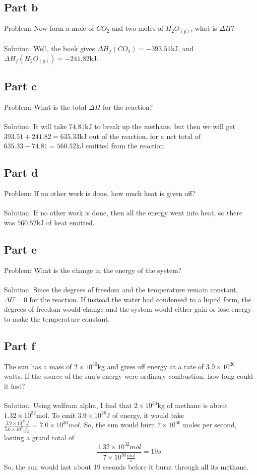 \documentclass[paper=a4, fontsize=11pt]{scrartcl} %
\numberwithin{equation}{section} %
\numberwithin{figure}{section} %
\numberwithin{table}{section} %
\begin{document}
\subsection*{Part b}
Problem: Now form a mole of $CO_2$ and two moles of $H_2O_{(g)}$, what is $\Delta H$?
\\
\\
Solution:
Well, the book gives $\Delta H_f(CO_2) = -393.51$kJ, and $\Delta H_f(H_2O_{(g)}) = -241.82$kJ.

\subsection*{Part c}
Problem: What is the total $\Delta H$ for the reaction?
\\
\\
Solution:
It will take $74.81$kJ to break up the methane, but then we will get $393.51+241.82=635.33$kJ
out of the reaction, for a net total of $635.33-74.81=560.52$kJ emitted from the reaction.

\subsection*{Part d}
Problem: If no other work is done, how much heat is given off?
\\
\\
Solution: If no other work is done, then all the energy went into heat, so there was
$560.52$kJ of heat emitted.

\subsection*{Part e}
Problem: What is the change in the energy of the system?
\\
\\
Solution: Since the degrees of freedom and the temperature remain constant, $\Delta U=0$ for
the reaction. If instead the water had condensed to a liquid form, the degrees of freedom would
change and the system would either gain or lose energy to make the temperature constant.

\subsection*{Part f}
The sun has a mass of $2\times 10^{30}$kg and gives off energy at a rate of $3.9\times 10^{26}$
watts. If the source of the sun's energy were ordinary combustion, how long could it last?
\\
\\
Solution:
Using wolfram alpha, I find that $2\times 10^{30}$kg of methane is about $1.32\times 10^{32}$mol.
To emit $3.9\times 10^{26}$J of energy, it would take
$\frac{3.9\times 10^{26}J}{5.6\times 10^5\frac{J}{mol}} = 7.0\times 10^{30}mol$.
So, the sun would burn $7\times 10^{30}$ moles per second, lasting a grand total of
\[
\frac{1.32\times 10^{32}mol}{7\times 10^{30}\frac{mol}{s}} = 19s
\]
So, the sun would last about 19 seconds before it burnt through all its methane.
\end{document}
